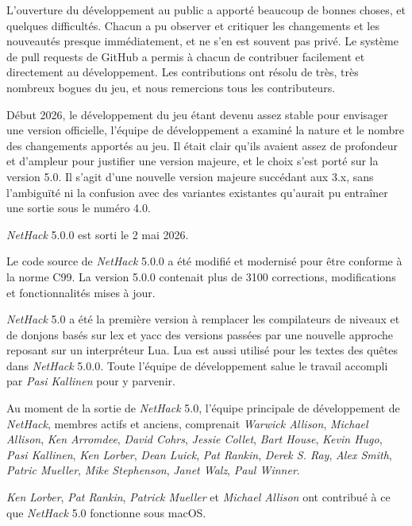 \documentclass[titlepage]{article}
\begin{document}
\medskip
L'ouverture du développement au public a apporté beaucoup de bonnes choses, et quelques
difficultés. Chacun a pu observer et critiquer les changements et les nouveautés
presque immédiatement, et ne s'en est souvent pas privé. Le système de pull requests
de GitHub a permis à chacun de contribuer facilement et directement au développement.
Les contributions ont résolu de très, très nombreux bogues du jeu, et nous remercions tous les
contributeurs.

\medskip
Début 2026, le développement du jeu étant devenu assez stable pour envisager
une version officielle, l'équipe de développement a examiné la nature et le nombre
des changements apportés au jeu. Il était clair qu'ils avaient assez de profondeur et
d'ampleur pour justifier une version majeure, et le choix s'est porté sur la version 5.0.
Il s'agit d'une nouvelle version majeure succédant aux 3.x, sans l'ambiguïté
ni la confusion avec des variantes existantes qu'aurait pu entraîner
une sortie sous le numéro 4.0.

\medskip
\textit{NetHack} 5.0.0 est sorti le 2 mai 2026.

\medskip
Le code source de \textit{NetHack} 5.0.0 a été modifié et modernisé pour être
conforme à la norme C99. La version 5.0.0 contenait plus de 3100 corrections,
modifications et fonctionnalités mises à jour.

\medskip
\textit{NetHack} 5.0 a été la première version à remplacer les compilateurs de niveaux
et de donjons basés sur lex et yacc des versions passées par une nouvelle approche
reposant sur un interpréteur Lua. Lua est aussi utilisé pour les textes des quêtes
dans \textit{NetHack} 5.0.0. Toute l'équipe de développement salue le travail
accompli par \textit{Pasi Kallinen} pour y parvenir.

\medskip
Au moment de la sortie de \textit{NetHack} 5.0, l'équipe principale
de développement de \textit{NetHack},
membres actifs et anciens, comprenait \textit{Warwick Allison}, \textit{Michael Allison},
\textit{Ken Arromdee}, \textit{David Cohrs}, \textit{Jessie Collet}, \textit{Bart House},
\textit{Kevin Hugo}, \textit{Pasi Kallinen}, \textit{Ken Lorber}, \textit{Dean Luick},
\textit{Pat Rankin}, \textit{Derek S. Ray}, \textit{Alex Smith}, \textit{Patric Mueller},
\textit{Mike Stephenson}, \textit{Janet Walz}, \textit{Paul Winner}.

\medskip
\textit{Ken Lorber}, \textit{Pat Rankin}, \textit{Patrick Mueller} et
\textit{Michael Allison} ont contribué à ce que \textit{NetHack} 5.0 fonctionne
sous macOS.
\end{document}
